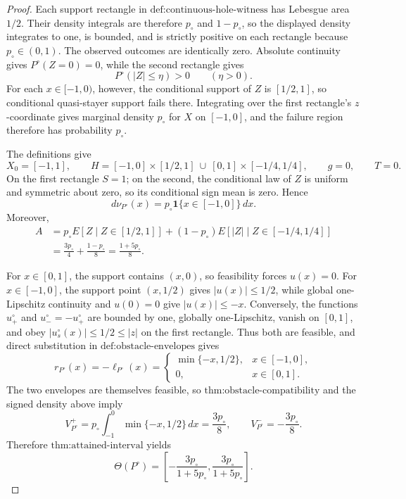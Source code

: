 \documentclass{article}
\begin{document}
\begin{proof}
Each support rectangle in \(\text{def:continuous-hole-witness}\) has Lebesgue area \(1/2\).  Their density integrals are therefore \(p_{\circ}\) and \(1-p_{\circ}\), so the displayed density integrates to one, is bounded, and is strictly positive on each rectangle because \(p_{\circ}\in(0,1)\).  The observed outcomes are identically zero.  Absolute continuity gives \(P^{\circ}(Z=0)=0\), while the second rectangle gives
\[
 P^{\circ}(|Z|\leq\eta)>0\qquad(\eta>0).
\]
For each \(x\in[-1,0)\), however, the conditional support of \(Z\) is \([1/2,1]\), so conditional quasi-stayer support fails there.  Integrating over the first rectangle's \(z\)-coordinate gives marginal density \(p_{\circ}\) for \(X\) on \([-1,0]\), and the failure region therefore has probability \(p_{\circ}\).

The definitions give
\[
 X_0=[-1,1],
 \qquad
 H=[-1,0]\times[1/2,1]\ \cup\ [0,1]\times[-1/4,1/4],
 \qquad g=0,
 \qquad T=0.
\]
On the first rectangle \(S=1\); on the second, the conditional law of \(Z\) is uniform and symmetric about zero, so its conditional sign mean is zero.  Hence
\[
 d\nu_{P^{\circ}}(x)=p_{\circ}\mathbf 1\{x\in[-1,0]\}\,dx.
\]
Moreover,
\[
 \begin{aligned}
 A
 &=p_{\circ}E[Z\mid Z\in[1/2,1]]
 +(1-p_{\circ})E[|Z|\mid Z\in[-1/4,1/4]]\\
 &=\frac{3p_{\circ}}4+\frac{1-p_{\circ}}8
 =\frac{1+5p_{\circ}}8.
 \end{aligned}
\]

For \(x\in[0,1]\), the support contains \((x,0)\), so feasibility forces \(u(x)=0\).  For \(x\in[-1,0]\), the support point \((x,1/2)\) gives \(|u(x)|\leq1/2\), while global one-Lipschitz continuity and \(u(0)=0\) give \(|u(x)|\leq-x\).  Conversely, the functions \(u_+^{\circ}\) and \(u_-^{\circ}=-u_+^{\circ}\) are bounded by one, globally one-Lipschitz, vanish on \([0,1]\), and obey \(|u_s^{\circ}(x)|\leq1/2\leq|z|\) on the first rectangle.  Thus both are feasible, and direct substitution in \(\text{def:obstacle-envelopes}\) gives
\[
 r_{P^{\circ}}(x)=-\ell_{P^{\circ}}(x)
 =\begin{cases}
 \min\{-x,1/2\},&x\in[-1,0],\\
 0,&x\in[0,1].
 \end{cases}
\]
The two envelopes are themselves feasible, so \(\text{thm:obstacle-compatibility}\) and the signed density above imply
\[
 V_{P^{\circ}}^+
 =p_{\circ}\int_{-1}^0\min\{-x,1/2\}\,dx
 =\frac{3p_{\circ}}8,
 \qquad
 V_{P^{\circ}}^-=-\frac{3p_{\circ}}8.
\]
Therefore \(\text{thm:attained-interval}\) yields
\[
 \Theta(P^{\circ})=
 \left[-\frac{3p_{\circ}}{1+5p_{\circ}},
         \frac{3p_{\circ}}{1+5p_{\circ}}\right].
\]


\end{proof}
\end{document}
